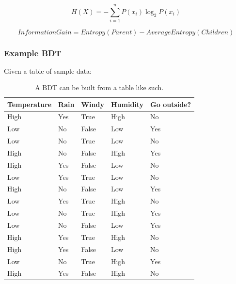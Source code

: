 \documentclass[
12pt,
headsepline,
bibliography=totoc,
twoside=semi,
fleqn
]{scrartcl}
\begin{document}
\begin{centering}
   \begin{equation}\label{fig:fig3}
      H(X)= - \sum_{i=1}^{n}P(x_i)\log_2{P(x_i)}
   \end{equation}  
\end{centering}
 
\begin{centering}
   \begin{equation}\label{fig:fig4}
      Information Gain = Entropy(Parent) - Average Entropy(Children)
   \end{equation}  
\end{centering}


 \subsubsection{Example BDT\label{sec:sec2-1-3}}
 Given a table of sample data: \\
 
 
 \begin{table}[]
   \begin{tabular}{l|l|l|l||l}
    Temperature & Rain & Windy & Humidity & Go outside? \\
    \hline
    \hline
    High & Yes & True & High & No \\
    \hline
    Low& No & False & Low & Yes \\
    \hline
    Low& No & True & Low & No \\
    \hline
    High& No & False &  High& Yes \\
    \hline
    High&  Yes& False & Low & No \\
    \hline
    Low& Yes & True & Low & No \\
    \hline
    High& No &  False&  Low& Yes \\
    \hline
    Low&  Yes& True & High & No \\
    \hline
    Low&  No& True & High &  Yes\\
    \hline
    Low&  No&  False& Low & Yes \\
    \hline
    High&  Yes& True & High &  No\\
    \hline
    High&  Yes&  False& Low & No \\
    Low&  No& True& High & Yes\\
    \hline
    High& Yes & False & High & No
   \end{tabular}
   \label{fig:fig5}
   \caption{A BDT can be built from a table like such.}
   \end{table}
\end{document}

